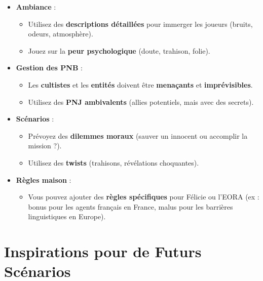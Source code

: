 \documentclass[10pt,a5paper,twoside]{book}
\begin{document}
\begin{itemize}
	\item \textbf{Ambiance} :
	\begin{itemize}
		\item Utilisez des \textbf{descriptions détaillées} pour immerger les joueurs (bruits, odeurs, atmosphère).
		\item Jouez sur la \textbf{peur psychologique} (doute, trahison, folie).
	\end{itemize}
	\item \textbf{Gestion des PNB} :
	\begin{itemize}
		\item Les \textbf{cultistes} et les \textbf{entités} doivent être \textbf{menaçants} et \textbf{imprévisibles}.
		\item Utilisez des \textbf{PNJ ambivalents} (allies potentiels, mais avec des secrets).
	\end{itemize}
	\item \textbf{Scénarios} :
	\begin{itemize}
		\item Prévoyez des \textbf{dilemmes moraux} (sauver un innocent ou accomplir la mission ?).
		\item Utilisez des \textbf{twists} (trahisons, révélations choquantes).
	\end{itemize}
	\item \textbf{Règles maison} :
	\begin{itemize}
		\item Vous pouvez ajouter des \textbf{règles spécifiques} pour Félicie ou l'EORA (ex : bonus pour les agents français en France, malus pour les barrières linguistiques en Europe).
	\end{itemize}
\end{itemize}

\newpage

\section{Inspirations pour de Futurs Scénarios}
\end{document}
